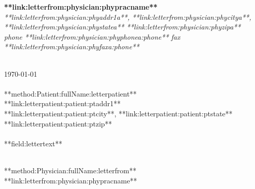 \documentclass{article}
\begin{document}
\begin{center}
	{\textbf{**link:letterfrom:physician:phypracname**}} \\
	\textsl{**link:letterfrom:physician:phyaddr1a**, **link:letterfrom:physician:phycitya**, **link:letterfrom:physician:phystatea** **link:letterfrom:physician:phyzipa** } \\
	\textsl{phone **link:letterfrom:physician:phyphonea:phone** fax **link:letterfrom:physician:phyfaxa:phone**}
\end{center}

\flushleft

\  \\

\today \\

\  \\

**method:Patient:fullName:letterpatient**	\\
**link:letterpatient:patient:ptaddr1**		\\
**link:letterpatient:patient:ptcity**, **link:letterpatient:patient:ptstate** **link:letterpatient:patient:ptzip** \\

\  \\

**field:lettertext**

\  \\

**method:Physician:fullName:letterfrom** \\
**link:letterfrom:physician:phypracname**
\end{document}

